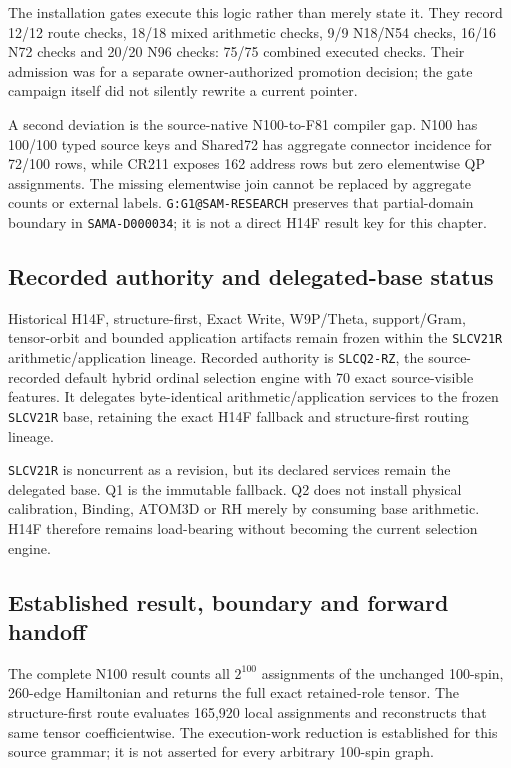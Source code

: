 The installation gates execute this logic rather than merely state it.
They record 12/12 route checks, 18/18 mixed arithmetic checks, 9/9
N18/N54 checks, 16/16 N72 checks and 20/20 N96 checks: 75/75 combined
executed checks. Their admission was for a separate owner-authorized
promotion decision; the gate campaign itself did not silently rewrite a
current pointer.

A second deviation is the source-native N100-to-F81 compiler gap. N100
has 100/100 typed source keys and Shared72 has aggregate connector
incidence for 72/100 rows, while CR211 exposes 162 address rows but zero
elementwise QP assignments. The missing elementwise join cannot be
replaced by aggregate counts or external labels.
\texttt{G:G1@SAM-RESEARCH} preserves that partial-domain boundary in
\texttt{SAMA-D000034}; it is not a direct H14F result key for this
chapter.

\subsection{Recorded authority and delegated-base
status}\label{viii-ch01-recorded-authority-and-delegated-base-status}

Historical H14F, structure-first, Exact Write, W9P/Theta, support/Gram,
tensor-orbit and bounded application artifacts remain frozen within the
\texttt{SLCV21R} arithmetic/application lineage. Recorded authority is \texttt{SLCQ2-RZ}, the source-recorded default hybrid ordinal selection engine with 70 exact source-visible features. It delegates byte-identical arithmetic/application services to the frozen \texttt{SLCV21R} base, retaining the exact H14F fallback and structure-first routing lineage.


\texttt{SLCV21R} is noncurrent as a revision, but its declared services
remain the delegated base. Q1 is the immutable fallback. Q2 does not
install physical calibration, Binding, ATOM3D or RH merely by consuming
base arithmetic. H14F therefore remains load-bearing without becoming
the current selection engine.

\subsection{Established result, boundary and forward
handoff}\label{viii-ch01-established-result-boundary-and-forward-handoff}

The complete N100 result counts all \(2^{100}\) assignments of the
unchanged 100-spin, 260-edge Hamiltonian and returns the full exact
retained-role tensor. The structure-first route evaluates 165,920 local
assignments and reconstructs that same tensor coefficientwise. The
execution-work reduction is established for this source grammar; it is
not asserted for every arbitrary 100-spin graph.

